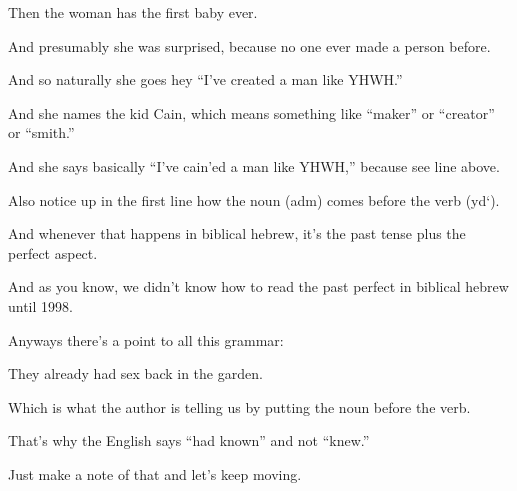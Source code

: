 
{
}
{
}
{
	Then the woman has the first baby ever.

	And presumably she was surprised, because no one ever made a person before.

	And so naturally she goes hey ``I've created a man like YHWH.''

	And she names the kid Cain, which means something like ``maker'' or ``creator'' or ``smith.''

	And she says basically ``I've cain'ed a man like YHWH,'' because see line above.

	Also notice up in the first line how the noun  (adm) comes before the verb  (yd`).

	And whenever that happens in biblical hebrew, it's the past tense plus the perfect aspect.

	And as you know, we didn't know how to read the past perfect in biblical hebrew until 1998.

	Anyways there's a point to all this grammar:

	They already had sex back in the garden.

	Which is what the author is telling us by putting the noun before the verb.

	That's why the English says ``had known'' and not ``knew.''

	Just make a note of that and let's keep moving.

}

